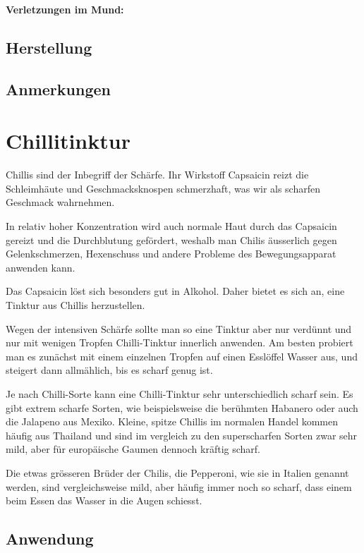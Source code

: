 \textbf{Verletzungen im Mund:} \\


\subsection{Herstellung}

\subsection{Anmerkungen}





\section{Chillitinktur}

Chillis sind der Inbegriff der Schärfe. Ihr Wirkstoff Capsaicin reizt die Schleimhäute und Geschmacksknospen schmerzhaft, was wir als scharfen Geschmack wahrnehmen.

In relativ hoher Konzentration wird auch normale Haut durch das Capsaicin gereizt und die Durchblutung gefördert, weshalb man Chilis äusserlich gegen Gelenkschmerzen, Hexenschuss und andere Probleme des Bewegungsapparat anwenden kann.

Das Capsaicin löst sich besonders gut in Alkohol. Daher bietet es sich an, eine Tinktur aus Chillis herzustellen.

Wegen der intensiven Schärfe sollte man so eine Tinktur aber nur verdünnt und nur mit wenigen Tropfen Chilli-Tinktur innerlich anwenden. Am besten probiert man es zunächst mit einem einzelnen Tropfen auf einen Esslöffel Wasser aus, und steigert dann allmählich, bis es scharf genug ist.

Je nach Chilli-Sorte kann eine Chilli-Tinktur sehr unterschiedlich scharf sein. Es gibt extrem scharfe Sorten, wie beispielsweise die berühmten Habanero oder auch die Jalapeno aus Mexiko. Kleine, spitze Chillis im normalen Handel kommen häufig aus Thailand und sind im vergleich zu den superscharfen Sorten zwar sehr mild, aber für europäische Gaumen dennoch kräftig scharf.

Die etwas grösseren Brüder der Chilis, die Pepperoni, wie sie in Italien genannt werden, sind vergleichsweise mild, aber häufig immer noch so scharf, dass einem beim Essen das Wasser in die Augen schiesst.

\cite{tinkturen}  \cite{heilkraeuterlexikon}

\subsection{Anwendung}

